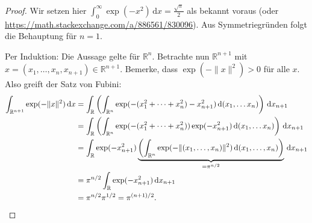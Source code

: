 \documentclass[10pt]{article}\usepackage[]{graphicx}\usepackage[]{color}
\newcommand{\R}{\mathbb{R}}
\newcommand{\df}{\,\textrm{d}}
\begin{document}
\begin{proof}
  Wir setzen hier
  $\int_{0}^{\infty} \exp(-x^2) \df x = \frac{\sqrt{\pi}}{2}$ als bekannt voraus
  (oder \url{https://math.stackexchange.com/a/886561/830096}). 
  Aus Symmetriegründen folgt die Behauptung für $n = 1$.

  Per Induktion: Die Aussage gelte für $\R^n$. Betrachte nun $\R^{n+1}$
  mit $x = (x_1, \dots, x_n, x_{n+1}) \in \R^{n+1}$. Bemerke, dass
  $\exp(-\|x\|^2) > 0$ für alle $x$.
  Also greift der Satz von Fubini:
    \begin{align*}
   \int_{\R^{n+1}} \exp(-\|x\|^2) \df x
   &= \int_{\R}\left(\int_{\R^n} \exp(-(x_1^2+\dots+x_n^2) - x_{n+1}^2) \df (x_1, \dots x_n) \right) \df x_{n+1} \\
   &= \int_{\R}\left(\int_{\R^n} \exp(-(x_1^2+\dots+x_n^2)) \exp(-x_{n+1}^2) \df (x_1, \dots x_n) \right) \df x_{n+1} \\
   &= \int_{\R}\exp(-x_{n+1}^2)\underbrace{\left(\int_{\R^n} \exp(-\|(x_1, \dots, x_n)\|^2) \df (x_1, \dots, x_n)\right)}_{= \pi^{n/2}} \df x_{n+1} \\
   &= \pi^{n/2} \int_{\R}\exp(-x_{n+1}^2) \df x_{n+1} \\
   &= \pi^{n/2} \pi^{1/2} = \pi^{(n+1)/2}.\qedhere
  \end{align*}
\end{proof}
\end{document}

